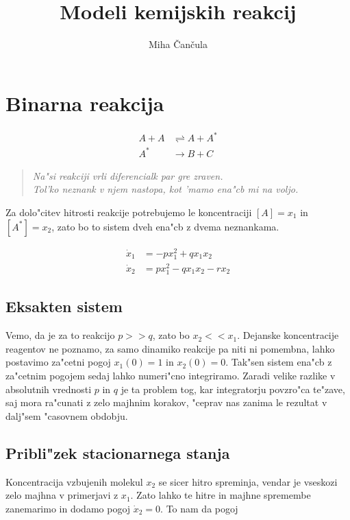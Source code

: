 \documentclass[a4paper,10pt]{article}
\title{Modeli kemijskih reakcij}
\author{Miha \v Can\v cula}
\begin{document}
 \section{Binarna reakcija}

\begin{align}
 A + A &\rightleftharpoons A + A^* \\
 A^* &\rightarrow B + C
\end{align}

\begin{verse}
\textit{Na"si reakciji vrli diferencialk par gre zraven.}  \\
\textit{Tol'ko neznank v njem nastopa, kot 'mamo ena"cb mi na voljo.} \\
\end{verse}

\begin{comment}
Reakciji ustreza sistem linearnih ena"cb prvega reda.
\end{comment}

Za dolo"citev hitrosti reakcije potrebujemo le koncentraciji $[A] = x_1$ in $[A^*] = x_2$, zato bo to sistem dveh ena"cb z dvema neznankama. 

\begin{align}
  \dot x_1 &= -p x_1^2 + q x_1 x_2 \label{eq:n1-sistem-1} \\
  \dot x_2 &= p x_1^2 - q x_1 x_2 - r x_2
\end{align}

\subsection{Eksakten sistem}
Vemo, da je za to reakcijo $p >> q$, zato bo $x_2 << x_1$. Dejanske koncentracije reagentov ne poznamo, za samo dinamiko reakcije pa niti ni pomembna, lahko postavimo za"cetni pogoj $x_1(0) = 1$ in $x_2(0) = 0$. Tak"sen sistem ena"cb z za"cetnim pogojem sedaj lahko numeri"cno integriramo. Zaradi velike razlike v absolutnih vrednosti $p$ in $q$ je ta problem tog, kar integratorju povzro"ca te"zave, saj mora ra"cunati z zelo majhnim korakov, "ceprav nas zanima le rezultat v dalj"sem "casovnem obdobju. 

\subsection{Pribli"zek stacionarnega stanja}
Koncentracija vzbujenih molekul $x_2$ se sicer hitro spreminja, vendar je vseskozi zelo majhna v primerjavi z $x_1$. Zato lahko te hitre in majhne spremembe zanemarimo in dodamo pogoj $\dot x_2 = 0$. To nam da pogoj
\end{document}

